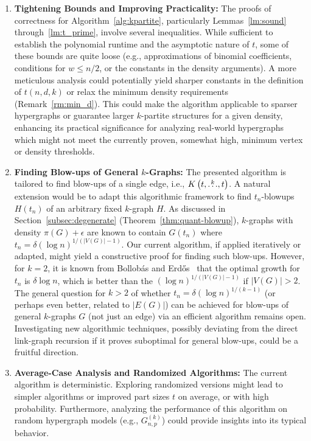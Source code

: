 \begin{enumerate}
    \item \textbf{Tightening Bounds and Improving Practicality:}
    The proofs of correctness for Algorithm~\ref{alg:kpartite}, particularly Lemmas~\ref{lm:sound} through~\ref{lm:t_prime},
    involve several inequalities.
    While sufficient to establish the polynomial runtime and the asymptotic nature of $t$,
    some of these bounds are quite loose (e.g., approximations of binomial coefficients, conditions for $w \leq n/2$,
    or the constants in the density arguments).
    A more meticulous analysis could potentially yield sharper constants in the definition of
    $t(n,d,k)$ or relax the minimum density requirements (Remark~\ref{rm:min_d}).
    This could make the algorithm applicable to sparser hypergraphs or guarantee larger $k$-partite structures for a given density,
    enhancing its practical significance for analyzing real-world hypergraphs which might not meet the currently proven,
    somewhat high, minimum vertex or density thresholds.

    \item \textbf{Finding Blow-ups of General $k$-Graphs:}
    The presented algorithm is tailored to find blow-ups of a single edge, i.e., $K\left(t, \overset{k}{\dots}, t\right)$.
    A natural extension would be to adapt this algorithmic framework to find $t_n$-blowups $H(t_n)$ of an arbitrary fixed $k$-graph $H$.
    As discussed in Section~\ref{subsec:degenerate} (Theorem~\ref{thm:quant-blowup}), $k$-graphs with density $\pi(G) + \epsilon$
    are known to contain $G(t_n)$ where $t_n = \delta (\log n)^{1/(|V(G)|-1)}$.
    Our current algorithm, if applied iteratively or adapted, might yield a constructive proof for finding such blow-ups.
    However, for $k=2$, it is known from Bollobás and Erd\H{o}s~\cite{bollobas1973structure} that the optimal growth for $t_n$
    is $\delta \log n$, which is better than the $(\log n)^{1/(|V(G)|-1)}$ if $|V(G)| > 2$.
    The general question for $k > 2$ of whether $t_n = \delta (\log n)^{1/(k-1)}$
    (or perhaps even better, related to $|E(G)|$) can be achieved for blow-ups of general $k$-graphs $G$ (not just an edge)
    via an efficient algorithm remains open.
    Investigating new algorithmic techniques, possibly deviating from the direct link-graph recursion if it proves
    suboptimal for general blow-ups, could be a fruitful direction.

    \item \textbf{Average-Case Analysis and Randomized Algorithms:}
    The current algorithm is deterministic.
    Exploring randomized versions might lead to simpler algorithms or improved part sizes $t$ on average, or with high probability.
    Furthermore, analyzing the performance of this algorithm on random hypergraph models (e.g., $G_{n,p}^{(k)}$)
    could provide insights into its typical behavior.


\end{enumerate}
